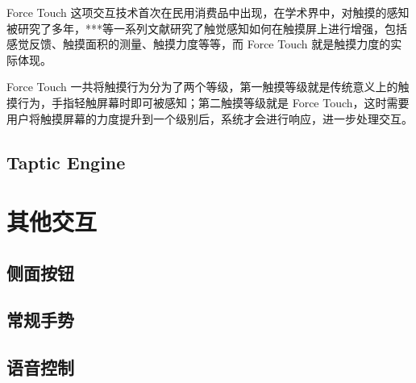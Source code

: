 Force Touch 这项交互技术首次在民用消费品中出现，在学术界中，对触摸的感知被研究了多年，***等一系列文献研究了触觉感知如何在触摸屏上进行增强，包括感觉反馈、触摸面积的测量、触摸力度等等，而 Force Touch 就是触摸力度的实际体现。

Force Touch 一共将触摸行为分为了两个等级，第一触摸等级就是传统意义上的触摸行为，手指轻触屏幕时即可被感知；第二触摸等级就是 Force Touch，这时需要用户将触摸屏幕的力度提升到一个级别后，系统才会进行响应，进一步处理交互。

\subsection{Taptic Engine}

\section{其他交互}

\subsection{侧面按钮}

\subsection{常规手势}

\subsection{语音控制}
